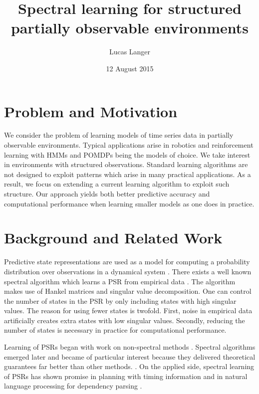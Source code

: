\documentclass{acm_proc_article-sp}
\begin{document}
\title{Spectral learning for structured partially observable environments}


\author{
\alignauthor
Lucas Langer\\
}

\date{12 August 2015}

\maketitle

\section{Problem and Motivation}

We consider the problem of learning models of time series data in partially observable environments. Typical applications arise in robotics and reinforcement learning with HMMs and POMDPs being the models of choice. We take  interest in environments with structured observations. Standard learning algorithms are not designed to exploit patterns which arise in many practical applications. As a result, we focus on extending a current learning algorithm to exploit such structure. Our approach yields both better predictive accuracy and computational performance when learning smaller models as one does in practice. 

\section{Background and Related Work}

Predictive state representations are used as a model for computing a probability distribution over observations in a dynamical system \cite{littman2001predictive}. There exists a well known spectral algorithm which learns a PSR from empirical data \cite{boots2010closing}. The algorithm makes use of Hankel matrices and singular value decomposition. One can control the number of states in the PSR by only including states with high singular values. The reason for using fewer states is twofold. First, noise in empirical data artificially creates extra states with low singular values. Secondly, reducing the number of states is necessary in practice for computational performance. 

Learning of PSRs began with work on non-spectral methods \cite{DBLP:conf/icml/Wiewiora05}. Spectral algorithms emerged later and became of particular interest because they delivered theoretical guarantees far better than other methods. \cite{boots2010closing}. On the applied side, spectral learning of PSRs has shown promise in planning with timing information \cite{pierrelucplanning2015} and in natural language processing for dependency parsing \cite{balle2013spectral}.
\end{document}
